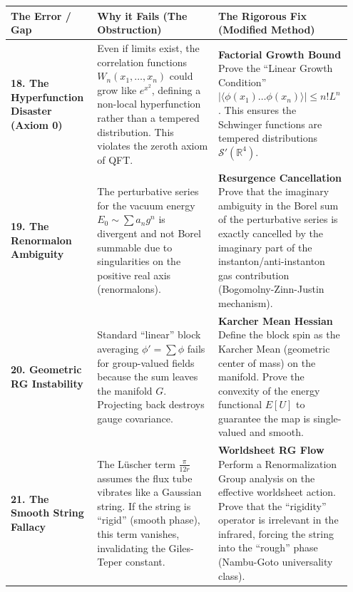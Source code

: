 \begin{center}
\begin{tabular}{|p{0.25\linewidth}|p{0.35\linewidth}|p{0.35\linewidth}|}
\hline
\textbf{The Error / Gap} & \textbf{Why it Fails (The Obstruction)} & \textbf{The Rigorous Fix (Modified Method)} \\
\hline
\textbf{18. The Hyperfunction Disaster (Axiom 0)} & Even if limits exist, the correlation functions $W_n(x_1, \dots, x_n)$ could grow like $e^{x^2}$, defining a non-local hyperfunction rather than a tempered distribution. This violates the zeroth axiom of QFT. & \textbf{Factorial Growth Bound} \newline Prove the ``Linear Growth Condition'' $| \langle \phi(x_1) \dots \phi(x_n) \rangle | \le n! L^n$. This ensures the Schwinger functions are tempered distributions $\mathcal{S}'(\mathbb{R}^4)$. \\
\hline
\textbf{19. The Renormalon Ambiguity} & The perturbative series for the vacuum energy $E_0 \sim \sum a_n g^n$ is divergent and not Borel summable due to singularities on the positive real axis (renormalons). & \textbf{Resurgence Cancellation} \newline Prove that the imaginary ambiguity in the Borel sum of the perturbative series is exactly cancelled by the imaginary part of the instanton/anti-instanton gas contribution (Bogomolny-Zinn-Justin mechanism). \\
\hline
\textbf{20. Geometric RG Instability} & Standard ``linear'' block averaging $\phi' = \sum \phi$ fails for group-valued fields because the sum leaves the manifold $G$. Projecting back destroys gauge covariance. & \textbf{Karcher Mean Hessian} \newline Define the block spin as the Karcher Mean (geometric center of mass) on the manifold. Prove the convexity of the energy functional $E[U]$ to guarantee the map is single-valued and smooth. \\
\hline
\textbf{21. The Smooth String Fallacy} & The Lüscher term $\frac{\pi}{12 r}$ assumes the flux tube vibrates like a Gaussian string. If the string is ``rigid'' (smooth phase), this term vanishes, invalidating the Giles-Teper constant. & \textbf{Worldsheet RG Flow} \newline Perform a Renormalization Group analysis on the effective worldsheet action. Prove that the ``rigidity'' operator is irrelevant in the infrared, forcing the string into the ``rough'' phase (Nambu-Goto universality class). \\
\hline
\end{tabular}
\end{center}

